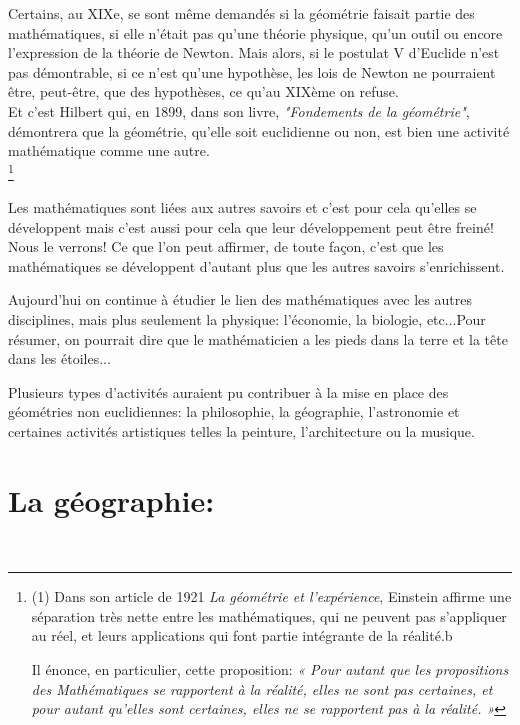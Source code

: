 \documentclass[a4paper, 12pt, twoside]{book}
\begin{document}
    Certains, au XIXe, se sont même demandés si la géométrie faisait partie des mathématiques, si elle n'était pas qu'une théorie physique, qu'un outil ou encore l'expression de la théorie de Newton. Mais alors, si le postulat V d'Euclide n'est pas démontrable, si ce n'est qu'une hypothèse, les lois de Newton ne pourraient être, peut-être, que des hypothèses, ce qu'au XIXème on refuse.   \\
    
      Et c'est Hilbert qui, en 1899, dans son livre, \textit{"Fondements de la géométrie"}, démontrera que la géométrie, qu'elle soit euclidienne ou non, est bien une activité mathématique comme une autre.\\
   
   \footnote{(1) Dans son article de 1921 \textit{La géométrie et l'expérience}, Einstein affirme une séparation très nette entre les mathématiques, qui ne peuvent pas s'appliquer au réel, et leurs applications qui font partie intégrante de la réalité.b\
  
  Il énonce, en particulier, cette proposition: \textit{« Pour autant que les propositions 
des Mathématiques se rapportent à la réalité, elles ne sont pas certaines, et pour 
autant qu'elles sont certaines, elles ne se rapportent pas à la réalité. »}}
  
 
  \newpage Les mathématiques sont liées aux autres savoirs et c'est pour cela qu'elles se développent mais c'est aussi pour cela que leur développement peut être freiné! Nous le verrons! Ce que l'on peut affirmer, de toute façon, c'est que les mathématiques se développent d'autant plus que les autres savoirs s'enrichissent.
   \bigskip
   
  
  
  
  
   

  
  Aujourd'hui on continue à étudier le lien des mathématiques avec les autres disciplines, mais plus seulement la physique: l'économie, la biologie, etc...Pour résumer, on pourrait dire que le mathématicien a les pieds dans la terre et la tête dans les étoiles...
  
   Plusieurs types d'activités auraient pu contribuer à la mise en place des géométries non euclidiennes: la philosophie, la géographie, l'astronomie et certaines activités artistiques telles la peinture, l'architecture ou la musique.

  \newpage  
  
     \section{La géographie:}\
     
\end{document}

